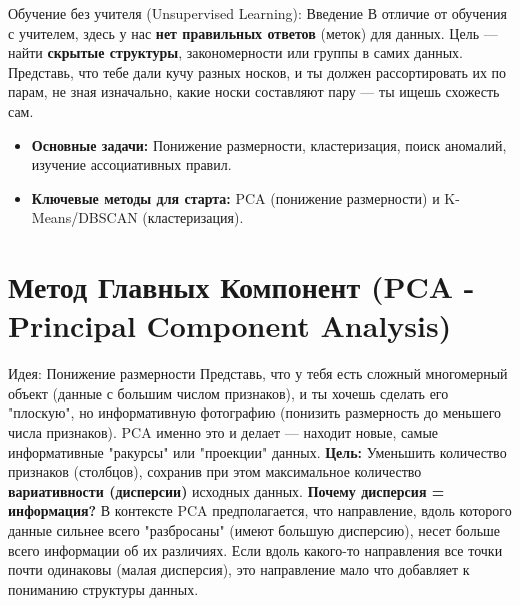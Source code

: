
\begin{textbox}{Обучение без учителя (Unsupervised Learning): Введение}
    В отличие от обучения с учителем, здесь у нас \textbf{нет правильных ответов} (меток) для данных. Цель — найти \textbf{скрытые структуры}, закономерности или группы в самих данных. Представь, что тебе дали кучу разных носков, и ты должен рассортировать их по парам, не зная изначально, какие носки составляют пару — ты ищешь схожесть сам.
    \begin{itemize}
        \item \textbf{Основные задачи:} Понижение размерности, кластеризация, поиск аномалий, изучение ассоциативных правил.
        \item \textbf{Ключевые методы для старта:} PCA (понижение размерности) и K-Means/DBSCAN (кластеризация).
    \end{itemize}
\end{textbox}

\section{Метод Главных Компонент (PCA - Principal Component Analysis)}

\begin{myblock}{Идея: Понижение размерности}
    Представь, что у тебя есть сложный многомерный объект (данные с большим числом признаков), и ты хочешь сделать его "плоскую", но информативную фотографию (понизить размерность до меньшего числа признаков). PCA именно это и делает — находит новые, самые информативные "ракурсы" или "проекции" данных.
    \vspace{0.5ex}
    \textbf{Цель:} Уменьшить количество признаков (столбцов), сохранив при этом максимальное количество \textbf{вариативности (дисперсии)} исходных данных.
    \vspace{0.5ex}
    \textbf{Почему дисперсия = информация?} В контексте PCA предполагается, что направление, вдоль которого данные сильнее всего "разбросаны" (имеют большую дисперсию), несет больше всего информации об их различиях. Если вдоль какого-то направления все точки почти одинаковы (малая дисперсия), это направление мало что добавляет к пониманию структуры данных.
\end{myblock}

